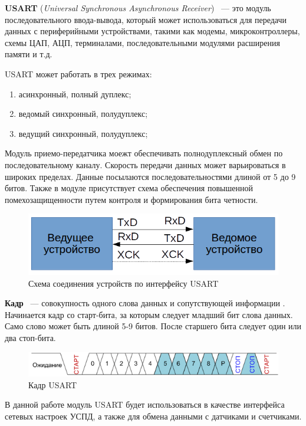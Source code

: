 \textbf{USART} (\textit{Universal Synchronous Asynchronous Receiver}) ~--- это модуль последовательного ввода-вывода, который может использоваться для передачи данных с периферийными устройствами, такими как модемы, микроконтроллеры, схемы ЦАП, АЦП, терминалами, последовательными модулями расширения памяти и т.д. \cite{usart1}

USART может работать в трех режимах:
\begin{enumerate}
\item асинхронный, полный дуплекс;
\item ведомый синхронный, полудуплекс;
\item ведущий синхронный, полудуплекс;
\end{enumerate}

Модуль приемо-передатчика моежт обеспечивать полнодуплексный обмен по последовательному каналу. Скорость передачи данных может варьироваться в широких пределах. Данные посылаются последовательностями длиной от 5 до 9 битов. Также в модуле присутствует схема обеспечения повышенной помехозащищенности путем контроля и формирования бита четности.

\begin{figure}[H]
	\label{usartscheme}
	\centering
		\includegraphics[scale=0.8]{img/usartscheme.png}
	\caption{Схема соединения устройств по интерфейсу USART}
\end{figure}

\textbf{Кадр} ~--- совокупность одного слова данных и сопутствующей информации \cite{usart1}. Начинается кадр со старт-бита, за которым следует младший бит слова данных. Само слово может быть длиной 5-9 битов. После 
старшего бита следует один или два стоп-бита.

\begin{figure}[H]
	\label{usartframe}
	\centering
		\includegraphics[scale=0.8]{img/usartframe.png}
	\caption{Кадр USART\cite{usart1}}
\end{figure}

В данной работе модуль USART будет использоваться в качестве интерфейса сетевых настроек УСПД, а также для обмена данными с датчиками и счетчиками.

